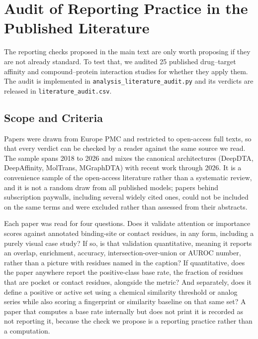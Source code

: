 \documentclass[11pt]{article}
\begin{document}
\section{Audit of Reporting Practice in the Published Literature}
The reporting checks proposed in the main text are only worth proposing if they are not already standard. To test that, we audited 25 published drug--target affinity and compound--protein interaction studies for whether they apply them. The audit is implemented in \texttt{analysis\_literature\_audit.py} and its verdicts are released in \texttt{literature\_audit.csv}.

\subsection{Scope and Criteria}
Papers were drawn from Europe PMC and restricted to open-access full texts, so that every verdict can be checked by a reader against the same source we read. The sample spans 2018 to 2026 and mixes the canonical architectures (DeepDTA, DeepAffinity, MolTrans, MGraphDTA) with recent work through 2026. It is a convenience sample of the open-access literature rather than a systematic review, and it is not a random draw from all published models; papers behind subscription paywalls, including several widely cited ones, could not be included on the same terms and were excluded rather than assessed from their abstracts.

Each paper was read for four questions. Does it validate attention or importance scores against annotated binding-site or contact residues, in any form, including a purely visual case study? If so, is that validation quantitative, meaning it reports an overlap, enrichment, accuracy, intersection-over-union or AUROC number, rather than a picture with residues named in the caption? If quantitative, does the paper anywhere report the positive-class base rate, the fraction of residues that are pocket or contact residues, alongside the metric? And separately, does it define a positive or active set using a chemical similarity threshold or analog series while also scoring a fingerprint or similarity baseline on that same set? A paper that computes a base rate internally but does not print it is recorded as not reporting it, because the check we propose is a reporting practice rather than a computation.
\end{document}

